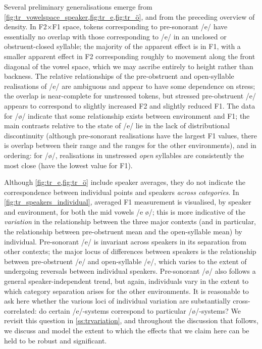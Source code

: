 Several preliminary generalisations emerge from \cref{fig:tr_vowelspace_speaker,fig:tr_e,fig:tr_ö}, and from the preceding overview of density. In F2$\times$F1 space, tokens corresponding to pre-sonorant /e/ have essentially no overlap with those corresponding to /e/ in an unclosed or obstruent-closed syllable; the majority of the apparent effect is in F1, with a smaller apparent effect in F2 corresponding roughly to movement along the front diagonal of the vowel space, which we may ascribe entirely to height rather than backness. The relative relationships of the pre-obstruent and open-syllable realisations of /e/ are ambiguous and appear to have some dependence on stress; the overlap is near-complete for unstressed tokens, but stressed pre-obstruent /e/ appears to correspond to slightly increased F2 and slightly reduced F1. The data for /\o/ indicate that some relationship exists between environment and F1; the main contrasts relative to the state of /e/ lie in the lack of distributional discontinuity (although pre-sonorant realisations have the largest F1 values, there is overlap between their range and the ranges for the other environments), and in ordering: for /\o/, realisations in unstressed \emph{open} syllables are consistently the most close (have the lowest value for F1).

Although \cref{fig:tr_e,fig:tr_ö} include speaker averages, they do not indicate the correspondence between individual points and speakers \emph{across categories}. In \cref{fig:tr_speakers_individual}, averaged F1 measurement is visualised, by speaker and environment, for both the mid vowels /e ø/; this is more indicative of the \emph{variation} in the relationship between the three major contexts (and in particular, the relationship between pre-obstruent mean and the open-syllable mean) by individual. Pre-sonorant /e/ is invariant across speakers in its separation from other contexts; the major locus of differences between speakers is the relationship between pre-obstruent /e/ and open-syllable /e/, which varies to the extent of undergoing reversals between individual speakers. Pre-sonorant /ø/ also follows a general speaker-independent trend, but again, individuals vary in the extent to which category separation arises for the other environments. It is reasonable to ask here whether the various loci of individual variation are substantially cross-correlated: do certain /e/-systems correspond to particular /ø/-systems? We revisit this question in \cref{ss:trvariation}, and throughout the discussion that follows, we discuss and model the extent to which the effects that we claim here can be held to be robust and significant.

